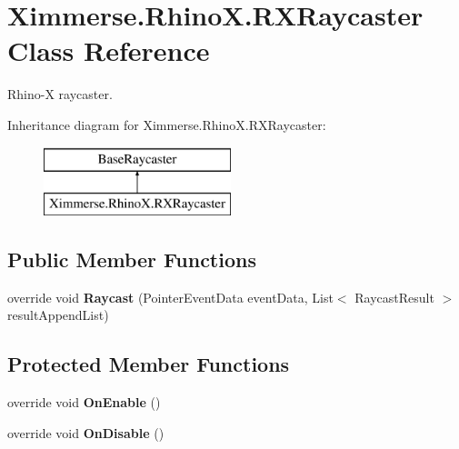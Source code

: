 \hypertarget{class_ximmerse_1_1_rhino_x_1_1_r_x_raycaster}{}\section{Ximmerse.\+Rhino\+X.\+R\+X\+Raycaster Class Reference}
\label{class_ximmerse_1_1_rhino_x_1_1_r_x_raycaster}


Rhino-\/X raycaster.  


Inheritance diagram for Ximmerse.\+Rhino\+X.\+R\+X\+Raycaster\+:\begin{figure}[H]
\begin{center}
\leavevmode
\includegraphics[height=2.000000cm]{class_ximmerse_1_1_rhino_x_1_1_r_x_raycaster}
\end{center}
\end{figure}
\subsection*{Public Member Functions}
\begin{DoxyCompactItemize}
\item 
\mbox{\label{class_ximmerse_1_1_rhino_x_1_1_r_x_raycaster_aeb344747b5d79275be7dbfe65f3c123d}} 
override void {\bfseries Raycast} (Pointer\+Event\+Data event\+Data, List$<$ Raycast\+Result $>$ result\+Append\+List)
\end{DoxyCompactItemize}
\subsection*{Protected Member Functions}
\begin{DoxyCompactItemize}
\item 
\mbox{\label{class_ximmerse_1_1_rhino_x_1_1_r_x_raycaster_a54c7a5659ffdecb608cf3dd1b27ded40}} 
override void {\bfseries On\+Enable} ()
\item 
\mbox{\label{class_ximmerse_1_1_rhino_x_1_1_r_x_raycaster_a9f7c917a1aab68fff8421d7c50f2760d}} 
override void {\bfseries On\+Disable} ()
\end{DoxyCompactItemize}
